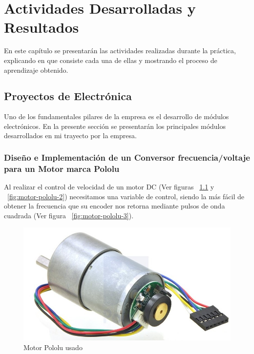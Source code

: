 \chapter{Actividades Desarrolladas y Resultados}
En este capítulo se presentarán las actividades realizadas durante la práctica, explicando en que consiste cada una de ellas y mostrando el proceso de aprendizaje obtenido.


\section{Proyectos de Electrónica}

Uno de los fundamentales pilares de la empresa es el desarrollo de módulos electrónicos. En la presente sección se presentarán los principales módulos desarrollados en mi trayecto por la empresa.


\subsection{Diseño e Implementación de un Conversor frecuencia/voltaje para un Motor marca Pololu}

Al realizar el control de velocidad de un motor DC (Ver figuras ~\ref{fig:motor-pololu-1} y ~\ref{fig:motor-pololu-2}) necesitamos una variable de control, siendo la más fácil de obtener la frecuencia que su encoder nos retorna mediante pulsos de onda cuadrada (Ver figura ~\ref{fig:motor-pololu-3}).

\begin{figure}[h!]
  \centering
  \includegraphics[scale=0.3]{images/activities/motor_pololu/motor1.jpg}
  \caption{Motor Pololu usado}
  \label{fig:motor-pololu-1}
\end{figure}

